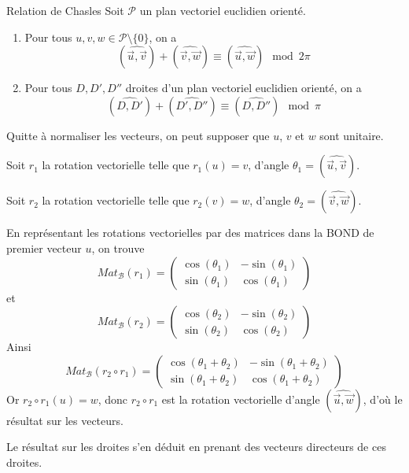 \documentclass[a4paper, 12pt]{article}
\begin{document}
\begin{theoreme}{Relation de Chasles}{}
    Soit $\mathcal{P}$ un plan vectoriel euclidien orienté.
    \begin{enumerate}
        \item Pour tous $u, v, w \in \mathcal{P}\setminus\{0\}$, on a
        $$
        (\widehat{\overrightarrow{u}, \overrightarrow{v}}) + (\widehat{\overrightarrow{v}, \overrightarrow{w}}) \equiv (\widehat{\overrightarrow{u}, \overrightarrow{w}}) \mod 2\pi
        $$
        \item Pour tous $D, D', D''$ droites d'un plan vectoriel euclidien orienté, on a
        $$
        (\widehat{D, D'}) + (\widehat{D', D''}) \equiv (\widehat{D, D''}) \mod \pi
        $$
    \end{enumerate}
\end{theoreme}

\begin{demonstration}
    Quitte à normaliser les vecteurs, on peut supposer que $u$, $v$ et $w$ sont unitaire.

    Soit $r_1$ la rotation vectorielle telle que $r_1(u) = v$, d'angle $\theta_1 = (\widehat{\overrightarrow{u}, \overrightarrow{v}})$.
    
    Soit $r_2$ la rotation vectorielle telle que $r_2(v) = w$, d'angle $\theta_2 = (\widehat{\overrightarrow{v}, \overrightarrow{w}})$.

    En représentant les rotations vectorielles par des matrices dans la BOND de premier vecteur $u$, on trouve
    $$
    Mat_{\mathcal{B}}(r_1) = \begin{pmatrix}
        \cos(\theta_1) & -\sin(\theta_1) \\
        \sin(\theta_1) & \cos(\theta_1)
    \end{pmatrix}
    $$
    et
    $$
    Mat_{\mathcal{B}}(r_2) = \begin{pmatrix}
        \cos(\theta_2) & -\sin(\theta_2) \\
        \sin(\theta_2) & \cos(\theta_2)
    \end{pmatrix}
    $$
    Ainsi
    $$
    Mat_{\mathcal{B}}(r_2 \circ r_1) = \begin{pmatrix}
        \cos(\theta_1 + \theta_2) & -\sin(\theta_1 + \theta_2) \\
        \sin(\theta_1 + \theta_2) & \cos(\theta_1 + \theta_2)
    \end{pmatrix}
    $$
    Or $r_2 \circ r_1(u) = w$, donc $r_2 \circ r_1$ est la rotation vectorielle d'angle $(\widehat{\overrightarrow{u}, \overrightarrow{w}})$, d'où le résultat sur les vecteurs.

    Le résultat sur les droites s'en déduit en prenant des vecteurs directeurs de ces droites.
\end{demonstration}
\end{document}
